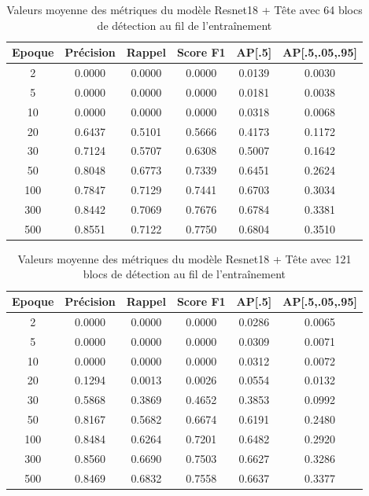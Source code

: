 \begin{table}[!ht]
    \caption{Valeurs moyenne des métriques du modèle Resnet18 + Tête avec 64 blocs de détection au fil de l'entraînement}
    \label{tab:resnet18+head_64n_metrics_avg}
    \centering
    \begin{tabular}{ |c||c|c|c|c|c|  }
        \hline
        \rowcolor{gray!50}
        Epoque & Précision & Rappel & Score F1 & AP[.5] & AP[.5,.05,.95]\\
        \hline
        2 & 0.0000 & 0.0000 & 0.0000 & 0.0139 & 0.0030\\
        5 & 0.0000 & 0.0000 & 0.0000 & 0.0181 & 0.0038\\
        10 & 0.0000 & 0.0000 & 0.0000 & 0.0318 & 0.0068\\
        20 & 0.6437 & 0.5101 & 0.5666 & 0.4173 & 0.1172\\
        30 & 0.7124 & 0.5707 & 0.6308 & 0.5007 & 0.1642\\
        50 & 0.8048 & 0.6773 & 0.7339 & 0.6451 & 0.2624\\
        100 & 0.7847 & 0.7129 & 0.7441 & 0.6703 & 0.3034\\
        300 & 0.8442 & 0.7069 & 0.7676 & 0.6784 & 0.3381\\
        500 & 0.8551 & 0.7122 & 0.7750 & 0.6804 & 0.3510\\
        \hline
    \end{tabular}
\end{table}

\begin{table}[!ht]
    \caption{Valeurs moyenne des métriques du modèle Resnet18 + Tête avec 121 blocs de détection au fil de l'entraînement}
    \label{tab:resnet18+head_121n_metrics_avg}
    \centering
    \begin{tabular}{ |c||c|c|c|c|c|  }
        \hline
        \rowcolor{gray!50}
        Epoque & Précision & Rappel & Score F1 & AP[.5] & AP[.5,.05,.95]\\
        \hline
        2 & 0.0000 & 0.0000 & 0.0000 & 0.0286 & 0.0065\\
        5 & 0.0000 & 0.0000 & 0.0000 & 0.0309 & 0.0071\\
        10 & 0.0000 & 0.0000 & 0.0000 & 0.0312 & 0.0072\\
        20 & 0.1294 & 0.0013 & 0.0026 & 0.0554 & 0.0132\\
        30 & 0.5868 & 0.3869 & 0.4652 & 0.3853 & 0.0992\\
        50 & 0.8167 & 0.5682 & 0.6674 & 0.6191 & 0.2480\\
        100 & 0.8484 & 0.6264 & 0.7201 & 0.6482 & 0.2920\\
        300 & 0.8560 & 0.6690 & 0.7503 & 0.6627 & 0.3286\\
        500 & 0.8469 & 0.6832 & 0.7558 & 0.6637 & 0.3377\\
        \hline
    \end{tabular}
\end{table}

